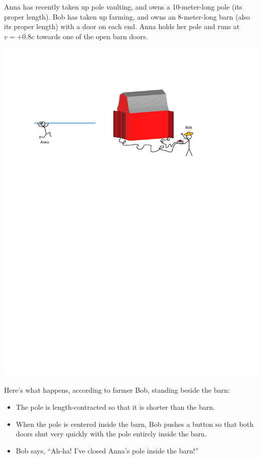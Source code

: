 Anna has recently taken up pole vaulting, and owns a 10-meter-long pole (its proper length).  Bob has taken up farming, and owns an 8-meter-long barn (also its proper length) with a door on each end.  Anna holds her pole and runs at $v=+0.8 c$ towards one of the open barn doors.  
\begin{center}
\includegraphics{pole_and_barn/pole_and_barn_drawing.pdf}
\end{center}
Here's what happens, according to farmer Bob, standing beside the barn:
\begin{itemize}[nosep,topsep=-\parskip]
\item The pole is length-contracted so that it is shorter than the barn.
\item When the pole is centered inside the barn, Bob pushes a button so that both doors shut very quickly with the pole entirely inside the barn.
\item Bob says, ``Ah-ha! I've closed Anna's pole inside the barn!''
\end{itemize}

